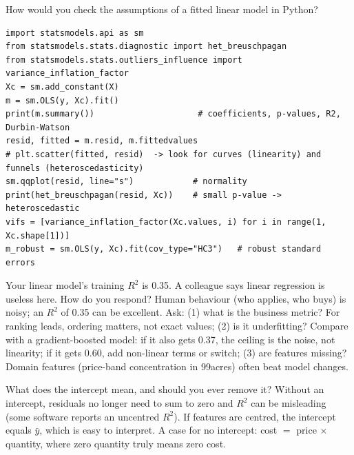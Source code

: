 \begin{qa}{How would you check the assumptions of a fitted linear model in Python?}
\why
\begin{lstlisting}
import statsmodels.api as sm
from statsmodels.stats.diagnostic import het_breuschpagan
from statsmodels.stats.outliers_influence import variance_inflation_factor
Xc = sm.add_constant(X)
m = sm.OLS(y, Xc).fit()
print(m.summary())                     # coefficients, p-values, R2, Durbin-Watson
resid, fitted = m.resid, m.fittedvalues
# plt.scatter(fitted, resid)  -> look for curves (linearity) and funnels (heteroscedasticity)
sm.qqplot(resid, line="s")            # normality
print(het_breuschpagan(resid, Xc))    # small p-value -> heteroscedastic
vifs = [variance_inflation_factor(Xc.values, i) for i in range(1, Xc.shape[1])]
m_robust = sm.OLS(y, Xc).fit(cov_type="HC3")   # robust standard errors
\end{lstlisting}
\end{qa}

\begin{qa}{\deep Your linear model's training $R^2$ is 0.35. A colleague says linear regression is useless here.
How do you respond?}
\why Human behaviour (who applies, who buys) is noisy; an $R^2$ of 0.35 can be excellent. Ask: (1) what is the
business metric? For ranking leads, ordering matters, not exact values; (2) is it underfitting? Compare with a
gradient-boosted model: if it also gets 0.37, the ceiling is the noise, not linearity; if it gets 0.60, add
non-linear terms or switch; (3) are features missing? Domain features (price-band concentration in 99acres) often
beat model changes.
\end{qa}

\begin{qa}{What does the intercept mean, and should you ever remove it?}
\why Without an intercept, residuals no longer need to sum to zero and $R^2$ can be misleading (some software reports
an uncentred $R^2$). If features are centred, the intercept equals $\bar y$, which is easy to interpret. A case for
no intercept: cost $=$ price $\times$ quantity, where zero quantity truly means zero cost.
\end{qa}

